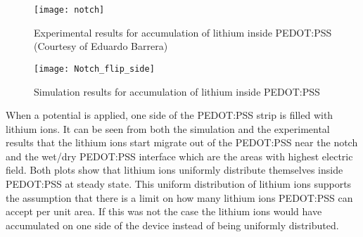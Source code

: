 \begin{doublespace}
\begin{figure}[!htp]
\centering
\texttt{[image: notch]}
\caption{Experimental results for accumulation of lithium inside PEDOT:PSS (Courtesy of Eduardo Barrera)} 
\label{notch}
\end{figure}

\begin{figure}[!htp]
\centering
\texttt{[image: Notch\_flip\_side]}
\caption{Simulation results for accumulation of lithium inside PEDOT:PSS} 
\label{Notch_flip_side}
\end{figure}

When a potential is applied, one side of the PEDOT:PSS strip is filled with lithium ions. It can be seen from both the simulation and the experimental results that the lithium ions start migrate out of the PEDOT:PSS near the notch and the wet/dry PEDOT:PSS interface which are the areas with highest electric field. Both plots show that lithium ions uniformly distribute themselves inside PEDOT:PSS at steady state. This uniform distribution of lithium ions supports the assumption that there is a limit on how many lithium ions PEDOT:PSS can accept per unit area. If this was not the case the lithium ions would have accumulated on one side of the device instead of being uniformly distributed.


\end{doublespace}

